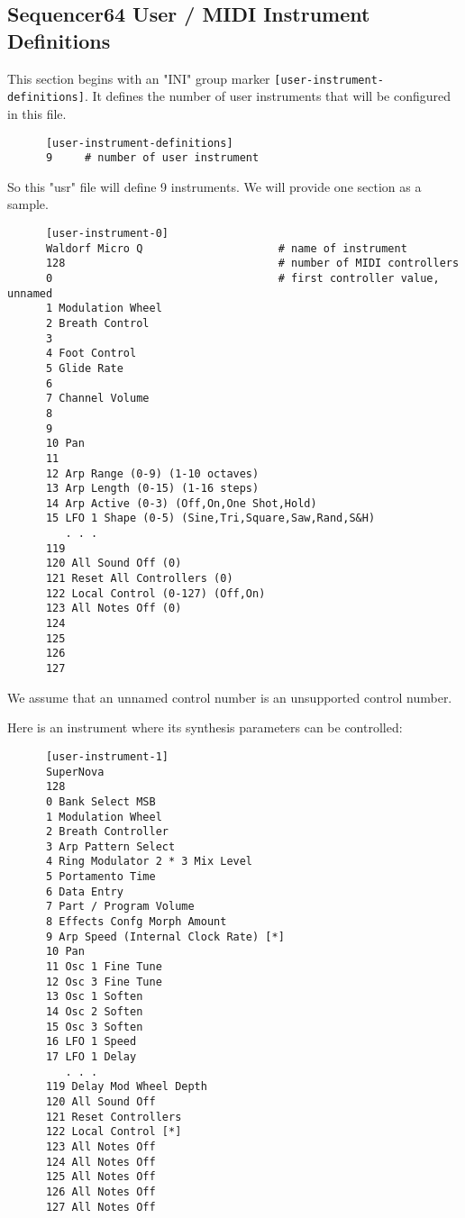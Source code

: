 \subsection{Sequencer64 User / MIDI Instrument Definitions}
\label{subsec:seq64_usr_file_midi_instrument_definitions}

   This section begins with an
   "INI" group marker \texttt{[user-instrument-definitions]}.
   It defines the number of user instruments that will be configured in this
   file.

   \begin{verbatim}
      [user-instrument-definitions]
      9     # number of user instrument
   \end{verbatim}

   So this "usr" file will define 9 instruments.  We will provide one section
   as a sample.

   \begin{verbatim}
      [user-instrument-0]
      Waldorf Micro Q                     # name of instrument
      128                                 # number of MIDI controllers
      0                                   # first controller value, unnamed
      1 Modulation Wheel
      2 Breath Control
      3 
      4 Foot Control
      5 Glide Rate
      6 
      7 Channel Volume
      8
      9
      10 Pan
      11 
      12 Arp Range (0-9) (1-10 octaves)
      13 Arp Length (0-15) (1-16 steps)
      14 Arp Active (0-3) (Off,On,One Shot,Hold)
      15 LFO 1 Shape (0-5) (Sine,Tri,Square,Saw,Rand,S&H)
         . . .
      119
      120 All Sound Off (0)
      121 Reset All Controllers (0)
      122 Local Control (0-127) (Off,On)
      123 All Notes Off (0)
      124
      125
      126
      127
   \end{verbatim}

   We assume that an unnamed control number is an unsupported control number.

   Here is an instrument where its synthesis parameters can be controlled:

   \begin{verbatim}
      [user-instrument-1]
      SuperNova
      128
      0 Bank Select MSB
      1 Modulation Wheel
      2 Breath Controller
      3 Arp Pattern Select
      4 Ring Modulator 2 * 3 Mix Level
      5 Portamento Time
      6 Data Entry
      7 Part / Program Volume
      8 Effects Confg Morph Amount
      9 Arp Speed (Internal Clock Rate) [*]
      10 Pan
      11 Osc 1 Fine Tune
      12 Osc 3 Fine Tune
      13 Osc 1 Soften
      14 Osc 2 Soften
      15 Osc 3 Soften
      16 LFO 1 Speed
      17 LFO 1 Delay
         . . .
      119 Delay Mod Wheel Depth
      120 All Sound Off
      121 Reset Controllers
      122 Local Control [*]
      123 All Notes Off
      124 All Notes Off
      125 All Notes Off
      126 All Notes Off
      127 All Notes Off
   \end{verbatim}

